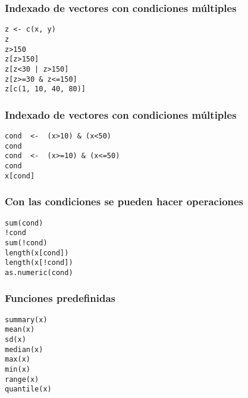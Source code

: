 \documentclass[xcolor={usenames,svgnames,dvipsnames}]{beamer}
\begin{document}
\begin{frame}[fragile]
\frametitle{Indexado de vectores con condiciones múltiples}
\label{sec-2-1-12}



\lstset{language=R}
\begin{lstlisting}
z <- c(x, y)
z
z>150
z[z>150]
z[z<30 | z>150]
z[z>=30 & z<=150]
z[c(1, 10, 40, 80)]
\end{lstlisting}
\end{frame}
\begin{frame}[fragile]
\frametitle{Indexado de vectores con condiciones múltiples}
\label{sec-2-1-13}


\lstset{language=R}
\begin{lstlisting}
cond  <-  (x>10) & (x<50)
cond
cond  <-  (x>=10) & (x<=50)
cond
x[cond]
\end{lstlisting}
\end{frame}
\begin{frame}[fragile]
\frametitle{Con las condiciones se pueden hacer operaciones}
\label{sec-2-1-14}


\lstset{language=R}
\begin{lstlisting}
sum(cond)
!cond
sum(!cond)
length(x[cond])
length(x[!cond])
as.numeric(cond)
\end{lstlisting}
    
\end{frame}
\begin{frame}[fragile]
\frametitle{Funciones predefinidas}
\label{sec-2-1-15}


\lstset{language=R}
\begin{lstlisting}
summary(x)
mean(x)
sd(x)
median(x)
max(x)
min(x)
range(x)
quantile(x)
\end{lstlisting}
\end{frame}
\end{document}
